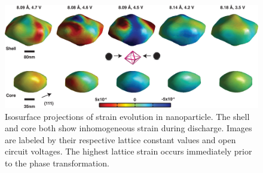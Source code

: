 \documentclass[journal=cmatex,manuscript=perspective]{achemso}
\begin{document}
\begin{figure}
  \includegraphics[width=\textwidth]{ulvestad2014-2}
  \caption{Isosurface projections of strain evolution in
     nanoparticle. The shell and core both
    show inhomogeneous strain during discharge. Images are labeled by
    their respective lattice constant values and open circuit
    voltages. The highest lattice strain occurs immediately prior to
    the phase transformation.\cite{ulvestad2014-2}}
  \label{figure:ulvestad2014-2}
\end{figure}
\end{document}
